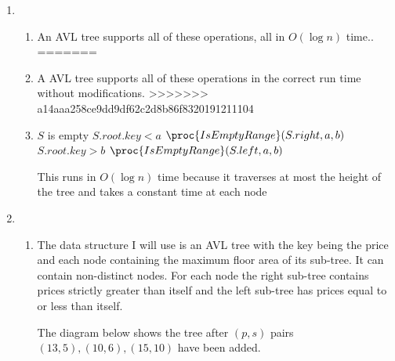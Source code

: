 \documentclass[10pt,a4paper]{article}
\begin{document}
\begin{enumerate}
\begin{enumerate}
\item
$m_0 = 1 > 1.4^0 - 1 = 0$

$m_1 = 2 > 1.4^1 - 1 = 0.4$

$m_2 = 3 > 1.96 - 1$

$m_3 = 5 > 2.744 - 1$

$m_4 = 8 > 3.8416 - 1$

Assume that it is true for some $m_h$ where 
$h > 4$

Then $m_{h+1} = m_h + m_{h-1} - m_{h-5} \geq 1.4^h - 1 + 1.4^{h-1} - 1 - 1.4^{h-5} + 1 = 1.4^{h}(1+ 1.4^{-1} - 1.4^{-5}) - 1 > 1.4^h(1+ 0.7 - 0.18) -1 > 1.4^h(1.4) - 1 = 1.4^{h+1} -1$

\end{enumerate}
\item
\begin{enumerate}
<<<<<<< HEAD
\item An AVL tree supports all of these operations, all in $O(\log n)$ time.. 
=======
\item A AVL tree supports all of these operations in the correct run time without modifications. 
>>>>>>> a14aaa258ce9dd9df62c2d8b86f8320191211104
\item 
\begin{codebox}
\li \If $S$ is empty
\zi \Then
\li		\Return {}
	\End 
\li \If $S.root.key < a$	
\zi \Then
\li			\Return $\proc{IsEmptyRange}(S.right, a, b)$
	\End
\li \If $S.root.key > b$
\zi	\Then 
\li 		\Return $\proc{IsEmptyRange}(S.left, a, b)$
\End
\li 	\Return {}
	

\end{codebox}

This runs in $O(\log n)$ time because it traverses at most the height of the tree and takes a constant time at each node
\end{enumerate}
\item
\begin{enumerate}
\item The data structure I will use is an AVL tree with the key being the price and each node containing the maximum floor area of its sub-tree. It can contain non-distinct nodes. For each node the right sub-tree contains prices strictly greater than itself and the left sub-tree has prices equal to or less than itself.

The diagram below shows the tree after $(p,s)$ pairs 
$(13, 5), (10, 6), (15, 10)$ have been added.


\end{enumerate}
\end{enumerate}
\end{document}
